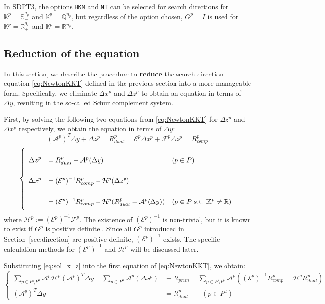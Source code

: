 \medskip

In SDPT3, the options \texttt{HKM} and \texttt{NT} can be selected for search directions for $\mathbb{K}^p = \mathbb{S}^{n_p}_+$ and $\mathbb{K}^p = \mathbb{Q}^{n_p}$, but regardless of the option chosen, $G^p = I$ is used for $\mathbb{K}^p = \mathbb{R}^{n_p}_+$ and $\mathbb{K}^p = \mathbb{R}^{n_p}$.
\medskip



\subsection{Reduction of the equation}
In this section, we describe the procedure to \textbf{reduce} the search direction equation \eqref{eq:NewtonKKT} defined in the previous section into a more manageable form. Specifically, we eliminate $\Delta x^p$ and $\Delta z^p$ to obtain an equation in terms of $\Delta y$, resulting in the so-called Schur complement system.

First, by solving the following two equations from \eqref{eq:NewtonKKT} for $\Delta z^p$ and $\Delta x^p$ respectively, we obtain the equation in terms of $\Delta y$:
\[
  (\mathcal{A}^p)^T \Delta y + \Delta z^p = R_{dual}^p,
  \quad
  \mathcal{E}^p \Delta x^p + \mathcal{F}^p \Delta z^p = R_{comp}^p
\]
\[
    \everymath{\displaystyle}
    \renewcommand{\arraystretch}{2.5}
    \left\{
    \begin{array}{rll}
    \Delta z^p &= R_{dual}^p - \mathcal{A}^p(\Delta y)  & (p\in P)\\
    \Delta x^p &= (\mathcal{E}^p)^{-1}R_{comp}^p - \mathcal{H}^p(\Delta z^p) \\
               &= (\mathcal{E}^p)^{-1}R_{comp}^p - \mathcal{H}^p(R_{dual}^p - \mathcal{A}^p(\Delta y))  & (p\in P \text{ s.t. } \mathbb{K}^p \neq \mathbb{R})
   \end{array}
   \right.
   \label{eq:sol_x_z}
\]
where $\mathcal{H}^p := (\mathcal{E}^p)^{-1}\mathcal{F}^p$. The existence of $(\mathcal{E}^p)^{-1}$ is non-trivial, but it is known to exist if $G^p$ is positive definite \cite{todd1998}. Since all $G^p$ introduced in Section~\ref{sec:direction} are positive definite, $(\mathcal{E}^p)^{-1}$ exists. The specific calculation methods for $(\mathcal{E}^p)^{-1}$ and $\mathcal{H}^p$ will be discussed later.

Substituting \eqref{eq:sol_x_z} into the first equation of \eqref{eq:NewtonKKT}, we obtain:
\[
    \left\{
    \begin{aligned}
        \sum_{p \in P\setminus P^u} \mathcal{A}^p\mathcal{H}^p(\mathcal{A}^p)^T\Delta y + \sum_{p \in P^u} \mathcal{A}^p(\Delta x^p) 
            &= R_{prim} - \sum_{p \in P\setminus P^u} \mathcal{A}^p((\mathcal{E}^p)^{-1}R_{comp}^p - \mathcal{H}^p R_{dual}^p) \\
        (\mathcal{A}^p)^T \Delta y 
            &= R^p_{dual} \qquad (p\in P^u)
    \end{aligned}
    \right.
    \label{eq:Schur_complement}
\]


